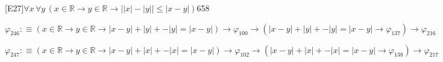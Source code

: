 \begin{fullproof}{[E27]}{$\forall x\,\forall y\,(x \in \mathbb{R} \to y \in \mathbb{R} \to \lvert \lvert x \rvert - \lvert y \rvert \rvert \leq \lvert x - y \rvert)$}{658}
\begin{abbrevlist}
\item $\varphi_{246} :\equiv (x \in \mathbb{R} \to y \in \mathbb{R} \to \lvert x - y \rvert + \lvert y \rvert + -\lvert y \rvert = \lvert x - y \rvert) \to \varphi_{100} \to (\lvert x - y \rvert + \lvert y \rvert + -\lvert y \rvert = \lvert x - y \rvert \to \varphi_{137}) \to \varphi_{216}$
\item $\varphi_{247} :\equiv (x \in \mathbb{R} \to y \in \mathbb{R} \to \lvert x - y \rvert + \lvert x \rvert + -\lvert x \rvert = \lvert x - y \rvert) \to \varphi_{102} \to (\lvert x - y \rvert + \lvert x \rvert + -\lvert x \rvert = \lvert x - y \rvert \to \varphi_{138}) \to \varphi_{217}$
\end{abbrevlist}
\end{fullproof}
